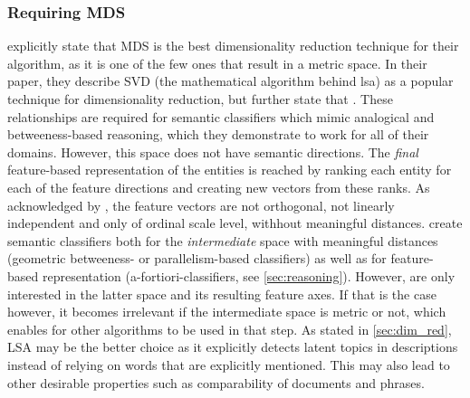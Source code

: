 
\subsubsection{Requiring MDS}
\label{sec:discuss_mds}

\textcite{Derrac2015} explicitly state that MDS is the best dimensionality reduction technique for their algorithm, as it is one of the few ones that result in a metric space. In their paper, they describe SVD (the mathematical algorithm behind \gls{lsa}) as a popular technique for dimensionality reduction, but further state that  \cite[14]{Derrac2015}. These relationships are required for semantic classifiers which mimic analogical and betweeness-based reasoning, which they demonstrate to work for all of their domains. However, this space does not have semantic directions. The \textit{final} feature-based representation of the entities is reached by ranking each entity for each of the feature directions and creating new vectors from these ranks. As acknowledged by \textcite[22]{Derrac2015}, the feature vectors are not orthogonal, not linearly independent and only of ordinal scale level, withhout meaningful distances. \textcite{Derrac2015} create semantic classifiers both for the \textit{intermediate} space with meaningful distances (geometric betweeness- or parallelism-based classifiers) as well as for feature-based representation (a-fortiori-classifiers, see \autoref{sec:reasoning}). However, \textcite{Ager2018,Alshaikh2020} are only interested in the latter space and its resulting feature axes. If that is the case however, it becomes irrelevant if the intermediate space is metric or not, which enables for other algorithms to be used in that step. As stated in \autoref{sec:dim_red}, LSA may be the better choice as it explicitly detects latent topics in descriptions instead of relying on words that are explicitly mentioned. This may also lead to other desirable properties such as comparability of documents and phrases.

